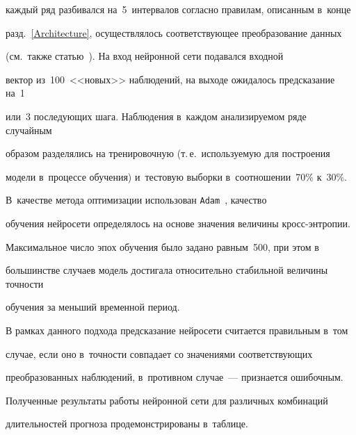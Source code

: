 каждый ряд разбивался на~5~интервалов согласно правилам, описанным в~конце 


разд.~\ref{Architecture}, осуществлялось соответствующее преобразование данных 


(см.\ также статью~\cite{Gorshenin2018}). На вход нейронной сети подавался входной 


вектор из~100~<<новых>> наблюдений, на выходе ожидалось предсказание на~1 


или~3 последующих шага. Наблюдения в~каждом анализируемом ряде случайным 


образом  разделялись на тренировочную (т.\,е.\ используемую для построения 


модели в~процессе обучения) и~тестовую выборки в~соотношении~70\% к~30\%. 


В~качестве метода оптимизации использован \verb"Adam"~\cite{Kingma2014}, качество 


обучения нейросети определялось на основе значения величины кросс-энт\-ро\-пии. 


Максимальное число эпох обучения было задано равным~500, при этом в~


большинстве случаев модель достигала относительно стабильной величины точности 


обучения за меньший временной период.





В рамках данного подхода предсказание нейросети считается правильным в~том 


случае, если оно в~точности совпадает со значениями соответствующих 


преобразованных наблюдений, в~противном случае~--- признается ошибочным. 


Полученные результаты работы нейронной сети для различных комбинаций 


длительностей прогноза продемонстрированы в~таблице. %





